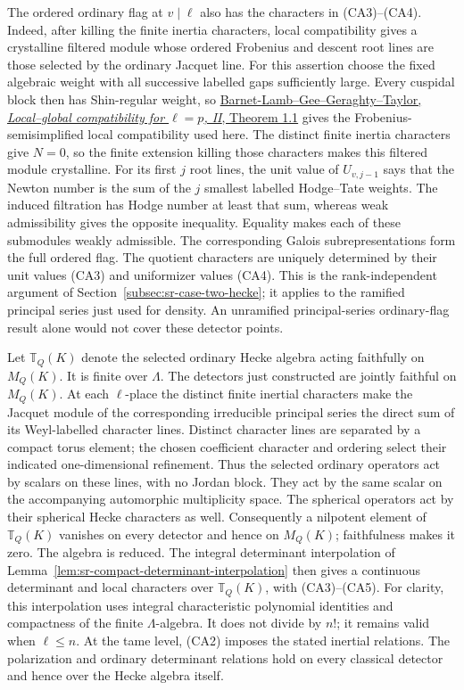 The ordered ordinary flag at \(v\mid\ell\) also has the
characters in (CA3)--(CA4). Indeed, after killing the finite
inertia characters, local compatibility gives a crystalline
filtered module whose ordered Frobenius and descent root
lines are those selected by the ordinary Jacquet line.
For this assertion choose the fixed algebraic weight with
all successive labelled gaps sufficiently large.
Every cuspidal block then has Shin-regular weight, so
\href{https://smf.emath.fr/system/files/2017-08/ens_ann-sc_47_165-179.pdf}
{Barnet-Lamb--Gee--Geraghty--Taylor,
\emph{Local--global compatibility for \(\ell=p\), II},
Theorem 1.1} gives the Frobenius-semisimplified
local compatibility used here. The distinct finite
inertia characters give \(N=0\), so the finite extension
killing those characters makes this filtered module
crystalline.
For its first \(j\) root lines, the unit value of \(U_{v,j-1}\)
says that the Newton number is the sum of the \(j\) smallest
labelled Hodge--Tate weights. The induced filtration has
Hodge number at least that sum, whereas weak admissibility
gives the opposite inequality. Equality makes each of
these submodules weakly admissible. The corresponding
Galois subrepresentations form the full ordered flag.
The quotient characters are uniquely determined by their
unit values (CA3) and uniformizer values (CA4).
This is the rank-independent argument of
Section~\ref{subsec:sr-case-two-hecke}; it applies to the
ramified principal series just used for density.
An unramified principal-series ordinary-flag result alone
would not cover these detector points.

Let \(\mathbb T_Q(K)\) denote the selected ordinary Hecke
algebra acting faithfully on \(M_Q(K)\).
It is finite over \(\Lambda\).
The detectors just constructed are jointly faithful on
\(M_Q(K)\).
At each \(\ell\)-place the distinct finite inertial
characters make the Jacquet module of the corresponding
irreducible principal series the direct sum of its
Weyl-labelled character lines. Distinct character
lines are separated by a compact torus element;
the chosen coefficient character and ordering select
their indicated one-dimensional refinement.
Thus the selected ordinary operators act by scalars
on these lines, with no Jordan block. They act by
the same scalar on the accompanying automorphic
multiplicity space. The spherical operators act by
their spherical Hecke characters as well.
Consequently a nilpotent element of \(\mathbb T_Q(K)\)
vanishes on every detector and hence on \(M_Q(K)\);
faithfulness makes it zero. The algebra is reduced.
The integral determinant interpolation of
Lemma~\ref{lem:sr-compact-determinant-interpolation}
then gives a continuous determinant and local characters
over \(\mathbb T_Q(K)\), with (CA3)--(CA5).
For clarity, this interpolation uses integral characteristic
polynomial identities and compactness of the finite
\(\Lambda\)-algebra. It does not divide by \(n!\);
it remains valid when \(\ell\leq n\).
At the tame level, (CA2) imposes the stated inertial
relations. The polarization and ordinary determinant
relations hold on every classical detector and hence
over the Hecke algebra itself.

